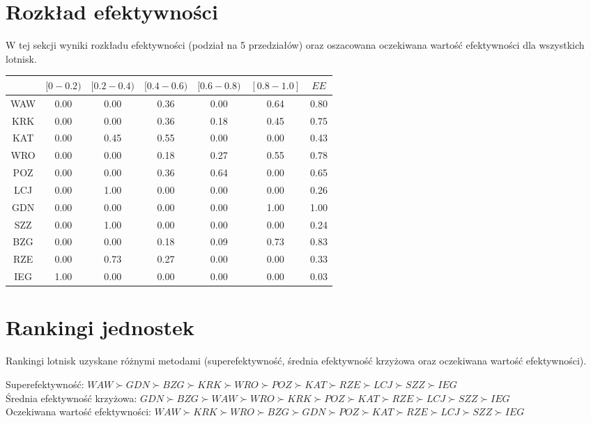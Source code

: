 \documentclass[a4paper,12pt]{article}
\begin{document}
\section{Rozkład efektywności}
W tej sekcji wyniki rozkładu efektywności (podział na 5 przedziałów) oraz oszacowana oczekiwana wartość efektywności dla wszystkich lotnisk.
\begin{table}[H]
\begin{tabular}{c|ccccc|c}
\hline
    & $[0-0.2)$ & $[0.2-0.4)$ & $[0.4-0.6)$ & $[0.6-0.8)$ & $[0.8-1.0]$ & $EE$    \\ \hline
WAW & 0.00 & 0.00 & 0.36 & 0.00 & 0.64 & 0.80 \\
KRK & 0.00 & 0.00 & 0.36 & 0.18 & 0.45 & 0.75 \\
KAT & 0.00 & 0.45 & 0.55 & 0.00 & 0.00 & 0.43 \\
WRO & 0.00 & 0.00 & 0.18 & 0.27 & 0.55 & 0.78 \\
POZ & 0.00 & 0.00 & 0.36 & 0.64 & 0.00 & 0.65 \\
LCJ & 0.00 & 1.00 & 0.00 & 0.00 & 0.00 & 0.26 \\
GDN & 0.00 & 0.00 & 0.00 & 0.00 & 1.00 & 1.00 \\
SZZ & 0.00 & 1.00 & 0.00 & 0.00 & 0.00 & 0.24 \\
BZG & 0.00 & 0.00 & 0.18 & 0.09 & 0.73 & 0.83 \\
RZE & 0.00 & 0.73 & 0.27 & 0.00 & 0.00 & 0.33 \\
IEG & 1.00 & 0.00 & 0.00 & 0.00 & 0.00 & 0.03 \\
\hline
\end{tabular}
\label{tab:efficiency-distribution}
\end{table}

\section{Rankingi jednostek}
Rankingi lotnisk uzyskane różnymi metodami (superefektywność, średnia efektywność krzyżowa oraz oczekiwana wartość efektywności).

\noindent Superefektywność: $WAW \succ GDN \succ BZG \succ KRK \succ WRO \succ POZ \succ KAT \succ RZE \succ LCJ \succ SZZ \succ IEG$ \\
Średnia efektywność krzyżowa: $GDN \succ BZG \succ WAW \succ WRO \succ KRK \succ POZ \succ KAT \succ RZE \succ LCJ \succ SZZ \succ IEG$ \\
Oczekiwana wartość efektywności: $WAW \succ KRK \succ WRO \succ BZG \succ GDN \succ POZ \succ KAT \succ RZE \succ LCJ \succ SZZ \succ IEG$ \\
\end{document}
